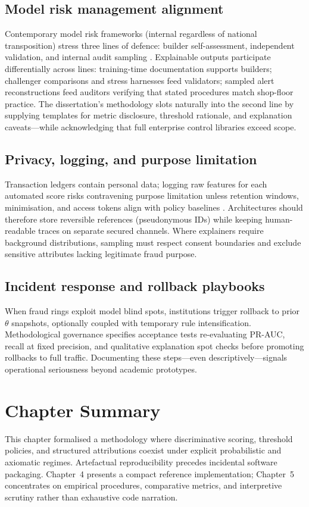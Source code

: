 \subsection{Model risk management alignment}
Contemporary model risk frameworks (internal regardless of national transposition) stress three lines of defence: builder self-assessment, independent validation, and internal audit sampling \cite{fraud_handbook}. Explainable outputs participate differentially across lines: training-time documentation supports builders; challenger comparisons and stress harnesses feed validators; sampled alert reconstructions feed auditors verifying that stated procedures match shop-floor practice. The dissertation's methodology slots naturally into the second line by supplying templates for metric disclosure, threshold rationale, and explanation caveats—while acknowledging that full enterprise control libraries exceed scope.

\subsection{Privacy, logging, and purpose limitation}
Transaction ledgers contain personal data; logging raw features for each automated score risks contravening purpose limitation unless retention windows, minimisation, and access tokens align with policy baselines \cite{gdpr_text}. Architectures should therefore store reversible references (pseudonymous IDs) while keeping human-readable traces on separate secured channels. Where explainers require background distributions, sampling must respect consent boundaries and exclude sensitive attributes lacking legitimate fraud purpose.

\subsection{Incident response and rollback playbooks}
When fraud rings exploit model blind spots, institutions trigger rollback to prior $\theta$ snapshots, optionally coupled with temporary rule intensification. Methodological governance specifies acceptance tests re-evaluating PR-AUC, recall at fixed precision, and qualitative explanation spot checks before promoting rollbacks to full traffic. Documenting these steps—even descriptively—signals operational seriousness beyond academic prototypes.

\section{Chapter Summary}
This chapter formalised a methodology where discriminative scoring, threshold policies, and structured attributions coexist under explicit probabilistic and axiomatic regimes. Artefactual reproducibility precedes incidental software packaging. Chapter~4 presents a compact reference implementation; Chapter~5 concentrates on empirical procedures, comparative metrics, and interpretive scrutiny rather than exhaustive code narration.